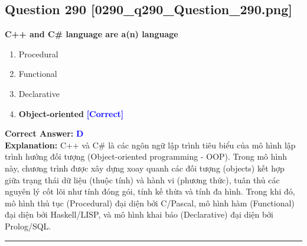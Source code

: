 \documentclass[11pt,a4paper]{article}
\begin{document}
\begin{minipage}{\textwidth}
\subsection*{Question 290 \quad \footnotesize{[0290\_q290\_Question\_290.png]}}
\noindent \textbf{C++ and C\# language are a(n) language}

\begin{enumerate}[label=\Alph*.]
    \item Procedural
    \item Functional
    \item Declarative
    \item \textbf{Object-oriented} \hfill \textcolor{blue}{\textbf{[Correct]}}
\end{enumerate}

\noindent \textbf{Correct Answer:} \textcolor{blue}{\textbf{D}} \\[2pt]
\noindent \textbf{Explanation:} C++ và C\# là các ngôn ngữ lập trình tiêu biểu của mô hình lập trình hướng đối tượng (Object-oriented programming - OOP). Trong mô hình này, chương trình được xây dựng xoay quanh các đối tượng (objects) kết hợp giữa trạng thái dữ liệu (thuộc tính) và hành vi (phương thức), tuân thủ các nguyên lý cốt lõi như tính đóng gói, tính kế thừa và tính đa hình. Trong khi đó, mô hình thủ tục (Procedural) đại diện bởi C/Pascal, mô hình hàm (Functional) đại diện bởi Haskell/LISP, và mô hình khai báo (Declarative) đại diện bởi Prolog/SQL.

\par\vspace{0.3cm}
\hrule
\vspace{0.3cm}
\end{minipage}
\end{document}
